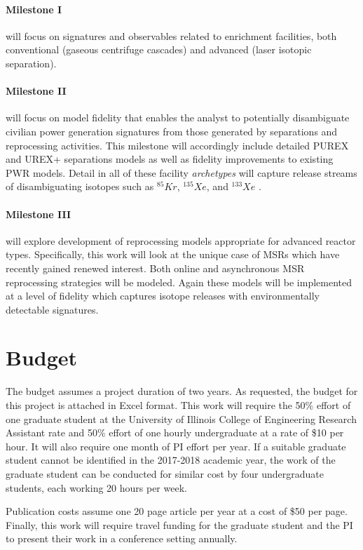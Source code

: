 \documentclass[11pt,letterpaper]{article}
\begin{document}
\paragraph{Milestone I} will focus on signatures and observables related to 
enrichment facilities, both conventional (gaseous centrifuge cascades) and 
advanced (laser isotopic separation). 

\paragraph{Milestone II} will focus on model fidelity that enables the analyst 
to potentially disambiguate civilian power generation signatures from those 
generated by separations and reprocessing activities. This milestone will 
accordingly include detailed PUREX and UREX+ separations models as well as 
fidelity improvements to existing \gls{PWR} models. Detail in all of these 
facility \emph{archetypes} will capture release streams of disambiguating 
isotopes such as $^{85}Kr$, $^{135}Xe$, and $^{133}Xe$ 
\cite{kalinowski_isotopic_2006,kemp_environmental_2016}.

\paragraph{Milestone III} will explore development of reprocessing models 
appropriate for advanced reactor types. Specifically, this work will look at 
the unique case of \glspl{MSR} which have recently gained renewed interest. 
Both online and asynchronous \gls{MSR} reprocessing strategies will be modeled. 
Again these models will be implemented at a level of fidelity which captures 
isotope releases with environmentally detectable signatures. 






\pagebreak
\section*{Budget}
The budget assumes a project duration of two years.  
As requested, the budget for this project is attached in Excel format.
This work will require the 
50\% effort of one graduate student at the University of Illinois College of 
Engineering Research Assistant rate and 50\% effort of one hourly undergraduate 
at a rate of \$10 per hour.  It will also require one month of \gls{PI} effort 
per year. If a suitable graduate student cannot be identified in the 2017-2018 
academic year, the work of the graduate student can be conducted for similar 
cost by four undergraduate students, each working 20 hours per week.  

Publication costs assume one 20 page 
article per year at a cost of \$50 per page.  Finally, this work will require 
travel funding for the graduate student and the \gls{PI} to present their work in a conference setting annually.  
\end{document}

